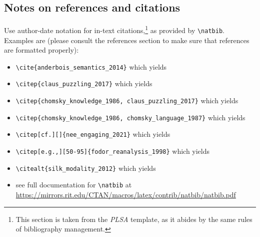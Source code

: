 \documentclass[11pt, letterpaper]{article}
\begin{document}
\subsection{Notes on references and citations}  \label{ref}
Use author-date notation for in-text citations,\footnote{This section is taken from the \textit{PLSA} template, as it abides by the same rules of bibliography management.} as provided by \verb=\natbib=. Examples are (please consult the references section to make sure that references are formatted properly):
\begin{itemize}
    \item \verb=\cite{anderbois_semantics_2014}= which yields \cite{anderbois_semantics_2014}
    \item \verb=\citep{claus_puzzling_2017}= which yields \citep{claus_puzzling_2017}
    \item \verb=\citep{chomsky_knowledge_1986, claus_puzzling_2017}= which yields \citep{chomsky_knowledge_1986, claus_puzzling_2017}
    \item \verb=\citep{chomsky_knowledge_1986, chomsky_language_1987}= which yields \citep{chomsky_knowledge_1986, chomsky_language_1987}
    \item \verb=\citep[cf.][]{nee_engaging_2021}= which yields \citep[cf.][]{nee_engaging_2021}
    \item \verb=\citep[e.g.,][50-95]{fodor_reanalysis_1998}= which yields \citep[e.g.,][50-95]{fodor_reanalysis_1998}
    \item \verb=\citealt{silk_modality_2012}= which yields \citealt{silk_modality_2012}
    \item see full documentation for \verb=\natbib= at\\ \href{https://mirrors.rit.edu/CTAN/macros/latex/contrib/natbib/natbib.pdf}{https://mirrors.rit.edu/CTAN/macros/latex/contrib/natbib/natbib.pdf}
\end{itemize}
\end{document}
